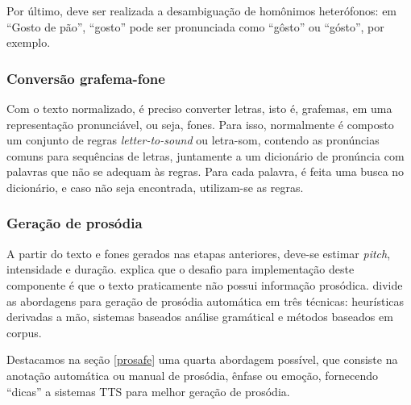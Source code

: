 Por último, deve ser realizada a desambiguação de homônimos heterófonos: em
``Gosto de pão'', ``gosto'' pode ser pronunciada como ``gôsto'' ou ``gósto'',
por exemplo.

\subsubsection{Conversão grafema-fone}
Com o texto normalizado, é preciso converter letras, isto é, grafemas, em uma
representação pronunciável, ou seja, fones. Para isso, normalmente é composto um
conjunto de regras \emph{letter-to-sound} ou letra-som, contendo as pronúncias
comuns para sequências de letras, juntamente a um dicionário de pronúncia com
palavras que não se adequam às regras. Para cada palavra, é feita uma busca no
dicionário, e caso não seja encontrada, utilizam-se as regras.

\subsubsection{Geração de prosódia}
\label{gerpros}
A partir do texto e fones gerados nas etapas anteriores, deve-se estimar
\emph{pitch}, intensidade e duração.  explica que o
desafio para implementação deste componente é que o texto praticamente não
possui informação prosódica.  divide as abordagens para
geração de prosódia automática em três técnicas: heurísticas derivadas a mão,
sistemas baseados análise gramátical e métodos baseados em corpus.

Destacamos na seção \ref{prosafe} uma quarta abordagem possível, que consiste na
anotação automática ou manual de prosódia, ênfase ou emoção, fornecendo
``dicas'' a sistemas TTS para melhor geração de prosódia.

